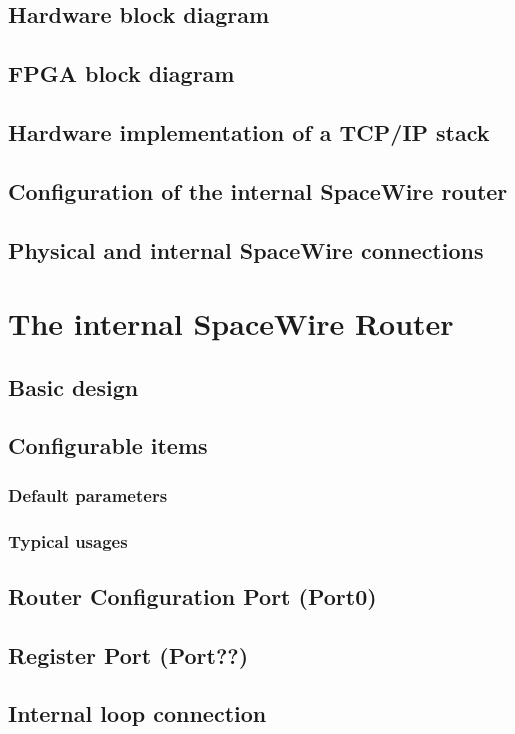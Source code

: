 \documentclass[a4paper,twoside,12pt]{book}
\begin{document}
\section{Hardware block diagram}
\section{FPGA block diagram}
\section{Hardware implementation of a TCP/IP stack}
\section{Configuration of the internal SpaceWire router}
\section{Physical and internal SpaceWire connections}

\chapter{The internal SpaceWire Router}
\section{Basic design}
\section{Configurable items}
\subsection{Default parameters}
\subsection{Typical usages}
\section{Router Configuration Port (Port0)}
\section{Register Port (Port??)}
\section{Internal loop connection}
\end{document}
